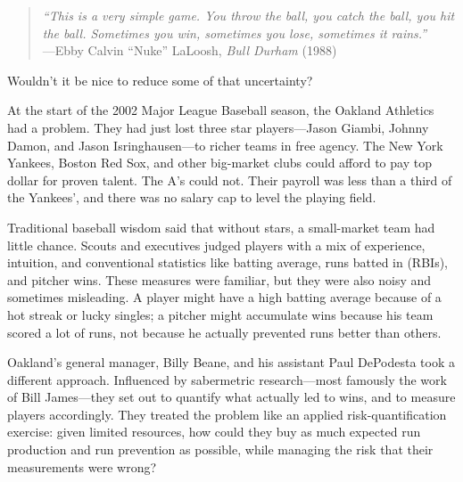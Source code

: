 \documentclass[11pt,openany]{book}
\begin{document}
\begin{corporateexample}

\end{corporateexample}

\begin{corporateexample}

\begin{quote}
\textit{``This is a very simple game. You throw the ball, you catch the ball,
you hit the ball. Sometimes you win, sometimes you lose, sometimes it rains.''}\\[2pt]
\hfill ---Ebby Calvin ``Nuke'' LaLoosh, \textit{Bull Durham} (1988)
\end{quote}

\medskip
Wouldn't it be nice to reduce some of that uncertainty?

At the start of the 2002 Major League Baseball season, the Oakland Athletics
had a problem. They had just lost three star players---Jason Giambi, Johnny
Damon, and Jason Isringhausen---to richer teams in free agency. The New York
Yankees, Boston Red Sox, and other big-market clubs could afford to pay top
dollar for proven talent. The A's could not. Their payroll was less than a
third of the Yankees', and there was no salary cap to level the playing field.

Traditional baseball wisdom said that without stars, a small-market team had
little chance. Scouts and executives judged players with a mix of experience,
intuition, and conventional statistics like batting average, runs batted in
(RBIs), and pitcher wins. These measures were familiar, but they were also
noisy and sometimes misleading. A player might have a high batting average
because of a hot streak or lucky singles; a pitcher might accumulate wins
because his team scored a lot of runs, not because he actually prevented runs
better than others.

Oakland's general manager, Billy Beane, and his assistant Paul DePodesta took
a different approach. Influenced by sabermetric research---most famously the
work of Bill James---they set out to quantify what actually led to wins, and to
measure players accordingly. They treated the problem like an applied
risk-quantification exercise: given limited resources, how could they buy as
much expected run production and run prevention as possible, while managing the
risk that their measurements were wrong?


\end{corporateexample}
\end{document}
